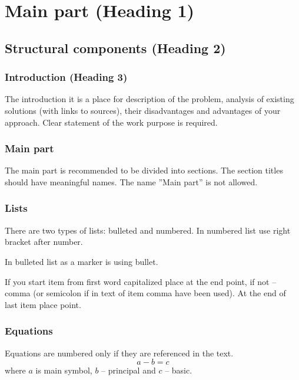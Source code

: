 

\section{Main part (Heading 1)}

\subsection{Structural components (Heading 2)}

\subsubsection{Introduction (Heading 3)}
The introduction it is a place for description of the problem, analysis of existing solutions (with links to sources), their disadvantages and  advantages of your approach. Clear statement of the work purpose is required.  

\subsubsection{Main part}
The main part is recommended to be divided into sections. The section titles should have meaningful names. The name ''Main part'' is not allowed.

\subsubsection{Lists}
There are two types of lists: bulleted and numbered. In numbered list use right bracket after number. 


In bulleted list as a marker is using bullet. 


If you start item from first word capitalized place at the end point, if not -- comma (or semicolon if in text of item comma have been used). At the end of last item place point.

\subsubsection{Equations}
Equations are numbered only if they are referenced in the text. 
\begin{equation}
a-b=c
\label{eq:1}
\end{equation}
where $a$ is main symbol, $b$ -- principal and $c$ -- basic.

